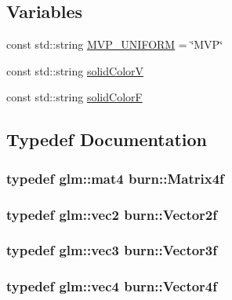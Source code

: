 \subsection*{Variables}
\begin{DoxyCompactItemize}
\item 
const std\-::string \hyperlink{namespaceburn_a6e76b4eddd0b0e54b5969cde910d0bc0}{M\-V\-P\-\_\-\-U\-N\-I\-F\-O\-R\-M} = \char`\"{}M\-V\-P\char`\"{}
\item 
const std\-::string \hyperlink{namespaceburn_a6eafdfe4d85acab9368409999e505dd3}{solid\-Color\-V}
\item 
const std\-::string \hyperlink{namespaceburn_ab930855fc914e51fe8d7f734a5534c6d}{solid\-Color\-F}
\end{DoxyCompactItemize}


\subsection{Typedef Documentation}
\hypertarget{namespaceburn_a643e9d2ffceb4304e3755a100268a7a3}{
\subsubsection[{Matrix4f}]{\setlength{\rightskip}{0pt plus 5cm}typedef glm\-::mat4 {\bf burn\-::\-Matrix4f}}}\label{namespaceburn_a643e9d2ffceb4304e3755a100268a7a3}
\hypertarget{namespaceburn_a2af71ec5609a2f2d501827804e86a9b8}{
\subsubsection[{Vector2f}]{\setlength{\rightskip}{0pt plus 5cm}typedef glm\-::vec2 {\bf burn\-::\-Vector2f}}}\label{namespaceburn_a2af71ec5609a2f2d501827804e86a9b8}
\hypertarget{namespaceburn_a9d6d349c94bc4dc9699427216128a0ef}{
\subsubsection[{Vector3f}]{\setlength{\rightskip}{0pt plus 5cm}typedef glm\-::vec3 {\bf burn\-::\-Vector3f}}}\label{namespaceburn_a9d6d349c94bc4dc9699427216128a0ef}
\hypertarget{namespaceburn_a2907b7b4adbde67cc68c401d9a30bdfe}{
\subsubsection[{Vector4f}]{\setlength{\rightskip}{0pt plus 5cm}typedef glm\-::vec4 {\bf burn\-::\-Vector4f}}}\label{namespaceburn_a2907b7b4adbde67cc68c401d9a30bdfe}


